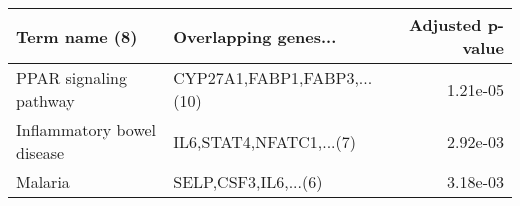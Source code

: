 \begin{tabular}{llr}
\toprule
             Term name (8) &        Overlapping genes... &  Adjusted p-value \\
\midrule
    PPAR signaling pathway & CYP27A1,FABP1,FABP3,...(10) &          1.21e-05 \\
Inflammatory bowel disease &     IL6,STAT4,NFATC1,...(7) &          2.92e-03 \\
                   Malaria &        SELP,CSF3,IL6,...(6) &          3.18e-03 \\
\bottomrule
\end{tabular}
